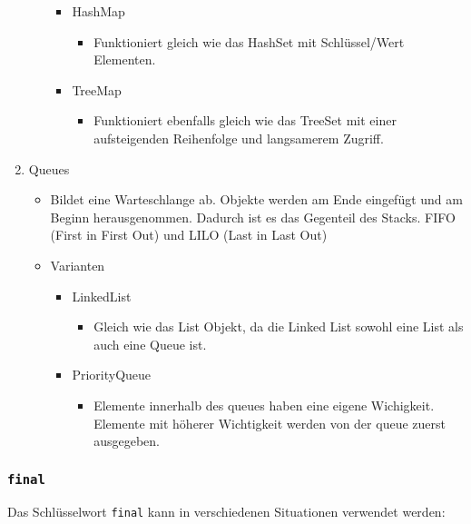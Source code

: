 \documentclass{article}
\begin{document}
\begin{enumerate}
\begin{itemize}
			\begin{itemize}
				\item{HashMap}
				\begin{itemize}
					\item{Funktioniert gleich wie das HashSet mit Schlüssel/Wert Elementen.}
				\end{itemize}
				\item{TreeMap}
				\begin{itemize}
					\item{Funktioniert ebenfalls gleich wie das TreeSet mit einer aufsteigenden Reihenfolge und langsamerem Zugriff.}
				\end{itemize}
			\end{itemize}
		\end{itemize}
		\item{Queues}
		\begin{itemize}
			\item{Bildet eine Warteschlange ab. Objekte werden am Ende eingefügt und am Beginn herausgenommen. Dadurch ist es das Gegenteil des Stacks. FIFO (First in First Out) und LILO (Last in Last Out)}
			\item{Varianten}
			\begin{itemize}
				\item{LinkedList}
				\begin{itemize}
					\item{Gleich wie das List Objekt, da die Linked List sowohl eine List als auch eine Queue ist.}
				\end{itemize}
				\item{PriorityQueue}
				\begin{itemize}
					\item{Elemente innerhalb des queues haben eine eigene Wichigkeit. Elemente mit höherer Wichtigkeit werden von der queue zuerst ausgegeben.}
				\end{itemize}
			\end{itemize}
		\end{itemize}
	\end{enumerate}
	\cprotect\subsubsection{\verb|final|}
	Das Schlüsselwort \verb|final| kann in verschiedenen Situationen verwendet werden:
\end{document}
